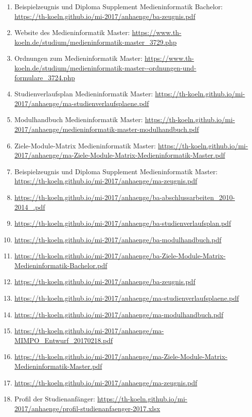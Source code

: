 \documentclass[BCOR12mm,DIV11,titlepage,a4paper,oneside,10pt]{scrbook}
\begin{document}
\begin{sloppypar}
\begin{flushleft}
\begin{enumerate}
\item{Beispielzeugnis und Diploma Supplement Medieninformatik Bachelor: \url{https://th-koeln.github.io/mi-2017/anhaenge/ba-zeugnis.pdf} } 
\item{Website des Medieninformatik Master: \url{https://www.th-koeln.de/studium/medieninformatik-master\_3729.php} } 
\item{Ordnungen zum Medieninformatik Master: \url{https://www.th-koeln.de/studium/medieninformatik-master--ordnungen-und-formulare\_3724.php} } 
\item{Studienverlaufsplan Medieninformatik Master: \url{https://th-koeln.github.io/mi-2017/anhaenge/ma-studienverlaufsplaene.pdf} } 
\item{Modulhandbuch Medieninformatik Master: \url{https://th-koeln.github.io/mi-2017/anhaenge/medieninformatik-master-modulhandbuch.pdf} } 
\item{Ziele-Module-Matrix Medieninformatik Master: \url{https://th-koeln.github.io/mi-2017/anhaenge/ma-Ziele-Module-Matrix-Medieninformatik-Master.pdf} } 
\item{Beispielzeugnis und Diploma Supplement Medieninformatik Master: \url{https://th-koeln.github.io/mi-2017/anhaenge/ma-zeugnis.pdf} } 
\item{\url{https://th-koeln.github.io/mi-2017/anhaenge/ba-abschlussarbeiten\_2010-2014\_.pdf}} 
\item{\url{https://th-koeln.github.io/mi-2017/anhaenge/ba-studienverlaufsplan.pdf}} 
\item{\url{https://th-koeln.github.io/mi-2017/anhaenge/ba-modulhandbuch.pdf}} 
\item{\url{https://th-koeln.github.io/mi-2017/anhaenge/ba-Ziele-Module-Matrix-Medieninformatik-Bachelor.pdf}} 
\item{\url{https://th-koeln.github.io/mi-2017/anhaenge/ba-zeugnis.pdf}} 
\item{\url{https://th-koeln.github.io/mi-2017/anhaenge/ma-studienverlaufsplaene.pdf}} 
\item{\url{https://th-koeln.github.io/mi-2017/anhaenge/ma-modulhandbuch.pdf}} 
\item{\url{https://th-koeln.github.io/mi-2017/anhaenge/ma-MIMPO\_Entwurf\_20170218.pdf}} 
\item{\url{https://th-koeln.github.io/mi-2017/anhaenge/ma-Ziele-Module-Matrix-Medieninformatik-Master.pdf}} 
\item{\url{https://th-koeln.github.io/mi-2017/anhaenge/ma-zeugnis.pdf}} 
\item{Profil der Studienanfänger: \url{https://th-koeln.github.io/mi-2017/anhaenge/profil-studienanfaenger-2017.xlsx} } 

\end{enumerate}
\end{flushleft}
\end{sloppypar}
\end{document}
